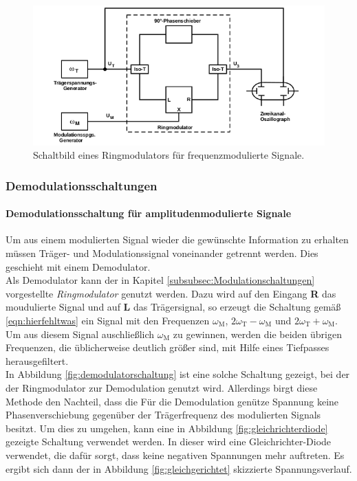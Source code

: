 \begin{figure}
  \centering
  \includegraphics{figures/frequenzmodulator.PNG}
  \caption{Schaltbild eines Ringmodulators für frequenzmodulierte Signale.}
  \label{fig:Ringmodulator_frequenz}
\end{figure}

\subsubsection{Demodulationsschaltungen}
\label{subsubsec:demodulationschaltungen}
\paragraph{Demodulationsschaltung für amplitudenmodulierte Signale}

Um aus einem modulierten Signal wieder die gewünschte Information zu erhalten
müssen Träger- und Modulationssignal voneinander getrennt werden.
Dies geschieht mit einem Demodulator.\\
Als Demodulator kann der in Kapitel \ref{subsubsec:Modulationschaltungen}
vorgestellte \textit{Ringmodulator} genutzt werden.
Dazu wird auf den Eingang \textbf{R} das moudulierte Signal und
auf \textbf{L} das Trägersignal, so erzeugt die Schaltung
gemäß \eqref{eqn:hierfehltwas} ein Signal mit den Frequenzen
$\omega_{\text{M}}$, $2\omega_{\text{T}} - \omega_{\text{M}}$
und $2\omega_{\text{T}} + \omega_{\text{M}}$.
Um aus diesem Signal auschließlich $\omega_{\text{M}}$ zu gewinnen,
werden die beiden übrigen Frequenzen, die üblicherweise deutlich größer sind,
mit Hilfe eines Tiefpasses herausgefiltert.\\
In Abbildung \ref{fig:demodulatorschaltung} ist eine solche Schaltung gezeigt,
bei der der Ringmodulator zur Demodulation genutzt wird. Allerdings
birgt diese Methode den Nachteil, dass die Für die Demodulation genütze
Spannung keine Phasenverschiebung gegenüber der Trägerfrequenz des
modulierten Signals besitzt.
Um dies zu umgehen, kann eine in Abbildung \ref{fig:gleichrichterdiode} gezeigte
Schaltung verwendet werden. In dieser wird eine Gleichrichter-Diode verwendet,
die dafür sorgt, dass keine negativen Spannungen mehr auftreten.
Es ergibt sich dann der in Abbildung \ref{fig:gleichgerichtet}
skizzierte Spannungsverlauf.


